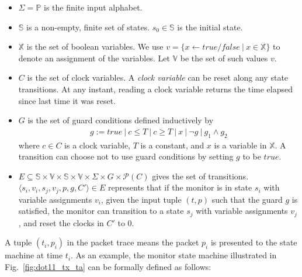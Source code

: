 \begin{definition}[Monitor]
  \begin{itemize}
    \item $\Sigma = \mathbb{P}$ is the finite input alphabet.

    \item $\mathbb{S}$ is a non-empty, finite set of states. $s_0 \in
      \mathbb{S}$ is the initial state.

    \item $\mathbb{X}$ is the set of boolean variables. We use $v = \{x
      \leftarrow true/false\ |\ x \in \mathbb{X}\}$ to denote an assignment of
      the variables. Let $\mathbb{V}$ be the set of such values $v$. 

    \item $C$ is the set of clock variables. A \textit{clock variable} can be
      reset along any state transitions. At any instant, reading a clock
      variable returns the time elapsed since last time it was reset.

    \item $G$ is the set of guard conditions defined inductively by
      \begin{align*}
        g := true\ |\ c \le T\ |\ c \ge T\ |\ x\ |\ \neg g\ |\ g_1 \land g_2
      \end{align*}%
      where $c \in C$ is a clock variable, $T$ is a constant, and $x$ is a
      variable in $\mathbb{X}$.  A transition can choose not to use guard
      conditions by setting $g$ to be $true$.

    \item $E \subseteq \mathbb{S} \times \mathbb{V} \times \mathbb{S} \times
      \mathbb{V} \times \Sigma \times  G \times \mathscr{P}(C)$ gives the set of
      transitions.\\ $\langle s_i, v_i, s_j, v_j, p, g, C'\rangle \in E$
      represents that if the monitor is in state $s_i$ with variable assignments
      $v_i$, given the input tuple $(t, p)$ such that the guard $g$ is
      satisfied, the monitor can transition to a state $s_j$ with variable assignments
      $v_j$, and reset the clocks in $C'$ to 0.
  \end{itemize}
  \label{def:sm}
\end{definition}

A tuple $(t_i, p_i)$ in the packet trace means the packet $p_i$ is presented to
the state machine at time $t_i$.  As an example, the monitor state machine
illustrated in Fig.~\ref{fig:dot11_tx_ta} can be formally defined as follows:

